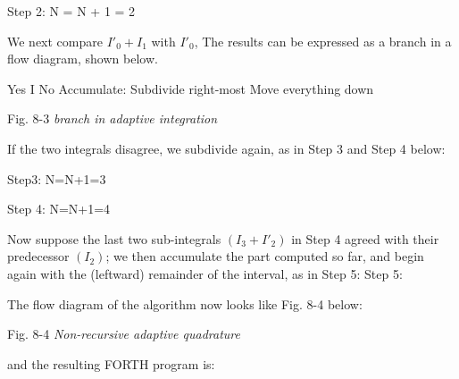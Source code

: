 Step 2: N = N + 1 = 2

We next compare $I'_0 + I_1$ with $I'_0$, The results can be expressed as a branch in a flow diagram, shown below.

Yes I No
Accumulate: Subdivide right-most
Move everything down

Fig. 8-3  \textit{branch in adaptive integration}

If the two integrals disagree, we subdivide again, as in Step 3 and
Step 4 below:

Step3: N=N+1=3

Step 4: N=N+1=4

Now suppose the last two sub-integrals $(I_3 + I'_2)$ in Step 4 agreed with their predecessor $(I_2)$; we then accumulate the part computed so far, and begin again with the (leftward) remainder of the interval, as in Step 5:
Step 5:

The flow diagram of the algorithm now looks like Fig. 8-4 below:

Fig. 8-4 \textit{Non-recursive adaptive quadrature}

and the resulting FORTH program is:


